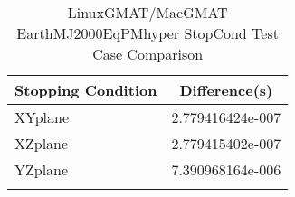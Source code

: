 \begin{table}[htbp!]
\centering
\caption{ LinuxGMAT/MacGMAT EarthMJ2000EqPMhyper StopCond Test Case Comparison}
      \begin{tabular}{lc}
      \hline\hline
          Stopping Condition & Difference(s) \\
         \hline
         XYplane & 2.779416424e-007 \\
         XZplane & 2.779415402e-007 \\
         YZplane & 7.390968164e-006 \\
      \hline\hline
      \label{Table: LinuxGMAT-MacGMAT EarthMJ2000EqPMhyper StopCond Table} 
\end{tabular}
\end{table}
